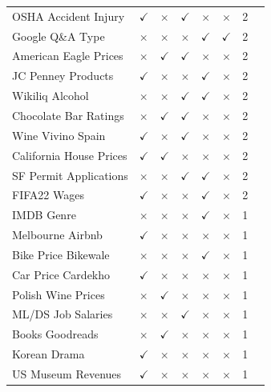 \begin{longtable}{llcccccr}
OSHA Accident Injury   & $\checkmark$ & $\times$     & $\checkmark$ & $\times$     & $\times$     & 2 \\
Google Q\&A Type   & $\times$     & $\times$     & $\times$     & $\checkmark$ & $\checkmark$ & 2 \\
American Eagle Prices     & $\times$     & $\checkmark$ & $\checkmark$ & $\times$     & $\times$     & 2 \\
JC Penney Products   & $\checkmark$ & $\times$     & $\times$     & $\checkmark$ & $\times$     & 2 \\
Wikiliq Alcohol   & $\times$     & $\times$     & $\checkmark$ & $\checkmark$ & $\times$     & 2 \\
Chocolate Bar Ratings   & $\times$     & $\checkmark$ & $\checkmark$ & $\times$     & $\times$     & 2 \\
Wine Vivino Spain   & $\checkmark$ & $\times$     & $\checkmark$ & $\times$     & $\times$     & 2 \\
California House Prices  & $\checkmark$ & $\checkmark$ & $\times$     & $\times$     & $\times$     & 2 \\
SF Permit Applications   & $\times$     & $\times$     & $\checkmark$ & $\checkmark$ & $\times$     & 2 \\
FIFA22 Wages  & $\checkmark$ & $\times$     & $\times$     & $\checkmark$ & $\times$     & 2 \\
IMDB Genre  & $\times$     & $\times$     & $\times$     & $\checkmark$ & $\times$     & 1 \\
Melbourne Airbnb   & $\checkmark$ & $\times$     & $\times$     & $\times$     & $\times$     & 1 \\
Bike Price Bikewale   & $\times$     & $\times$     & $\times$     & $\checkmark$ & $\times$     & 1 \\
Car Price Cardekho   & $\checkmark$ & $\times$     & $\times$     & $\times$     & $\times$     & 1 \\
Polish Wine Prices  & $\times$     & $\checkmark$ & $\times$     & $\times$     & $\times$     & 1 \\
ML/DS Job Salaries  & $\times$     & $\times$     & $\checkmark$ & $\times$     & $\times$     & 1 \\
Books Goodreads    & $\times$     & $\checkmark$ & $\times$     & $\times$     & $\times$     & 1 \\
Korean Drama     & $\checkmark$ & $\times$     & $\times$     & $\times$     & $\times$     & 1 \\
US Museum Revenues   & $\checkmark$ & $\times$     & $\times$     & $\times$     & $\times$     & 1 \\

\end{longtable}

